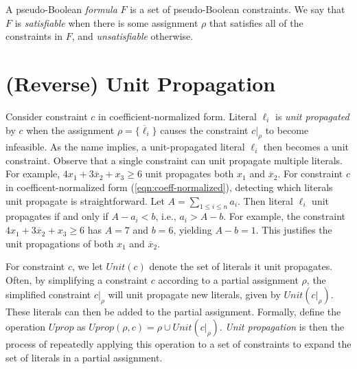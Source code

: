 \documentclass{easychair}
\renewcommand{\obar}[1]{\overline{#1}}
\newcommand{\lit}{\ell}
\newcommand{\assign}{\rho}
\newcommand{\simplify}[2]{#1|_{#2}}
\newcommand{\unit}{\mathit{Unit}}
\newcommand{\uprop}{\mathit{Uprop}}
\newcommand{\imply}{\Rightarrow}
\begin{document}

A pseudo-Boolean {\em formula} $F$ is a set of pseudo-Boolean
constraints.  We say that $F$ is {\em satisfiable} when there is some
assignment $\assign$ that satisfies all of the constraints in $F$, and
{\em unsatisfiable} otherwise.  



\section{(Reverse) Unit Propagation}

Consider constraint $c$ in coefficient-normalized form.  Literal
$\lit_i$ is {\em unit propagated} by $c$ when the assignment $\assign =
\{ \obar{\lit}_i \}$ causes the constraint $\simplify{c}{\assign}$ to become
infeasible.  As the name implies, a unit-propagated literal $\lit_i$ then becomes a unit constraint.
Observe that a single constraint can unit propagate
multiple literals.  For example, $4 x_1 + 3 \obar{x}_2 + x_3 \geq 6$
unit propagates both $x_1$ and $\obar{x}_2$.
For constraint $c$ in coefficent-normalized form
(\ref{eqn:coeff-normalized}), detecting which literals unit propagate
is straightforward.  Let $A = \sum_{1 \leq i \leq n} a_{i}$.  Then
literal $\lit_{i}$ unit propagates if and only if $A - a_{i} < b$,
i.e., $a_{i} > A - b$.  For example, the constraint $4 x_1 + 3
\obar{x}_2 + x_3 \geq 6$ has $A = 7$ and $b=6$, yielding $A-b=1$.
This justifies the unit propagations of both $x_1$ and $\obar{x}_2$.

For constraint $c$, we let $\unit(c)$ denote the set of literals it
unit propagates.  Often, by simplifying a constraint $c$ according to
a partial assignment $\assign$, the simplified constraint $\simplify{c}{\assign}$
will unit propagate new literals, given by $\unit(\simplify{c}{\assign})$.  These
literals can then be added to the partial assignment.  Formally,
define the operation $\uprop$ as  $\uprop(\assign, c) = \assign \cup \unit(\simplify{c}{\assign})$.
{\em Unit propagation} is then the process of
repeatedly applying this operation to a set of constraints to expand the
set of literals in a partial assignment.
\end{document}
